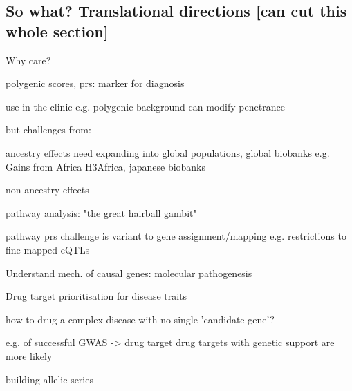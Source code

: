 \subsection{So what? Translational directions [can cut this whole section]}

\begin{outline}

\1 Why care?

    \2 polygenic scores, prs: marker for diagnosis

        \3 use in the clinic
            \4 e.g. polygenic background can modify penetrance 

        \3 but challenges from:

            \4 ancestry effects
            \4 need expanding into global populations, global biobanks e.g. Gains from Africa H3Africa, japanese biobanks

            \4 non-ancestry effects

    \2 pathway analysis: "the great hairball gambit"

    \2 pathway prs
        \3 challenge is variant to gene assignment/mapping
            \4 e.g. restrictions to fine mapped eQTLs

    \2 Understand mech. of causal genes: molecular pathogenesis

    \2 Drug target prioritisation for disease traits

    \2 how to drug a complex disease with no single 'candidate gene'?

        \3 e.g. of successful GWAS -> drug target
            \4 drug targets with genetic support are more likely

        \3 building allelic series


\end{outline}

